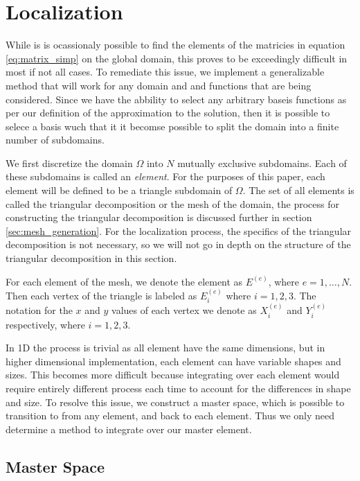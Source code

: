 \documentclass[../fem.tex]{subfile}
\begin{document}
\section{Localization}%
\label{sec:localization}

While is is ocassionaly possible to find the elements of the matricies in
equation \ref{eq:matrix_simp} on the global domain, this proves to be
exceedingly difficult in most if not all cases. To remediate this issue, we
implement a generalizable method that will work for any domain and and
functions that are being considered. Since we have the abbility to select any
arbitrary baseis functions as per our definition of the approximation to the
solution, then it is possible to selece a basis wuch that it it becomse
possible to split the domain into a finite number of subdomains.

We first discretize the domain $\Omega$ into $N$ mutually exclusive subdomains.
Each of these subdomains is called an \textit{element}. For the purposes of
this paper, each element will be defined to be a triangle subdomain of
$\Omega$. The set of all elements is called the triangular decomposition or the
mesh of the domain, the process for constructing the triangular decomposition
is discussed further in section \ref{sec:mesh_generation}. For the localization
process, the specifics of the triangular decomposition is not necessary, so we
will not go in depth on the structure of the triangular decomposition in this
section.

For each element of the mesh, we denote the element as $E^{(e)}$, where
$e=1,\ldots,N$. Then each vertex of the triangle is labeled as $E^{(e)}_i$
where $i=1,2,3$. The notation for the $x$ and $y$ values of each vertex we
denote as $X^{(e)}_i$ and $Y^{(e)}_i$ respectively, where $i=1,2,3$.

In 1D the process is trivial as all element have the same dimensions, but in
higher dimensional implementation, each element can have variable shapes and
sizes. This becomes more difficult because integrating over each element would
require entirely different process each time to account for the differences in
shape and size. To resolve this issue, we construct a master space, which is
possible to transition to from any element, and back to each element. Thus we
only need determine a method to integrate over our master element.

\subsection{Master Space}%
\label{sub:master_space}
\end{document}

